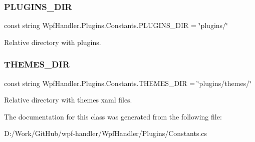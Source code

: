 \subsubsection{\texorpdfstring{P\+L\+U\+G\+I\+N\+S\+\_\+\+D\+IR}{PLUGINS\_DIR}}
{\footnotesize\ttfamily const string Wpf\+Handler.\+Plugins.\+Constants.\+P\+L\+U\+G\+I\+N\+S\+\_\+\+D\+IR = \char`\"{}plugins/\char`\"{}}



Relative directory with plugins. 

\mbox{\label{class_wpf_handler_1_1_plugins_1_1_constants_aa7969fd3e77b585b42f0c99a5440dbb2}} 
\subsubsection{\texorpdfstring{T\+H\+E\+M\+E\+S\+\_\+\+D\+IR}{THEMES\_DIR}}
{\footnotesize\ttfamily const string Wpf\+Handler.\+Plugins.\+Constants.\+T\+H\+E\+M\+E\+S\+\_\+\+D\+IR = \char`\"{}plugins/themes/\char`\"{}}



Relative directory with themes xaml files. 



The documentation for this class was generated from the following file\+:\begin{DoxyCompactItemize}
\item 
D\+:/\+Work/\+Git\+Hub/wpf-\/handler/\+Wpf\+Handler/\+Plugins/Constants.\+cs\end{DoxyCompactItemize}
